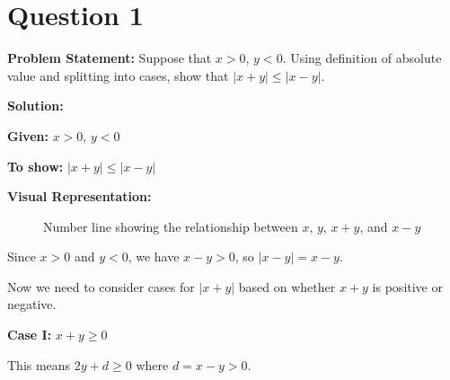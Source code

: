 \clearpage
\section*{Question 1}

\textbf{Problem Statement:} Suppose that $x > 0$, $y < 0$. Using definition of absolute value and splitting into cases, show that $|x + y| \leq |x - y|$.

\vspace{1em}

\textbf{Solution:}

\textbf{Given:} $x > 0$, $y < 0$

\textbf{To show:} $|x + y| \leq |x - y|$

\vspace{1em}

\textbf{Visual Representation:}

\begin{figure}[h!]
\centering
{}
\caption{Number line showing the relationship between $x$, $y$, $x+y$, and $x-y$}
\label{fig:q01_numberline}
\end{figure}

Since $x > 0$ and $y < 0$, we have $x - y > 0$, so $|x - y| = x - y$.

Now we need to consider cases for $|x + y|$ based on whether $x + y$ is positive or negative.

\vspace{1em}

\textbf{Case I:} $x + y \geq 0$ 

This means $2y + d \geq 0$ where $d = x - y > 0$.

